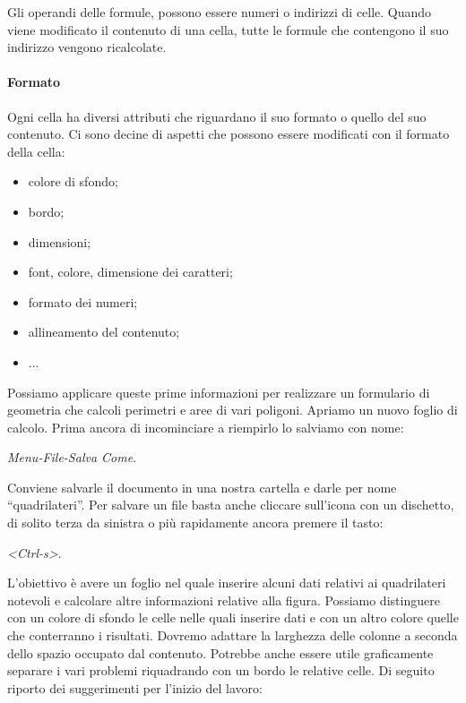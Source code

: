 Gli operandi delle formule, possono essere numeri o indirizzi di celle.
Quando viene modificato il contenuto di una cella, tutte
le formule che contengono il suo indirizzo vengono ricalcolate.

\paragraph{Formato}

Ogni cella ha diversi attributi che riguardano il suo formato o quello del
suo contenuto.
Ci sono decine di aspetti che possono essere modificati con
il formato della cella:

\begin{itemize} [noitemsep]
\item colore di sfondo;
\item bordo;
\item dimensioni;
\item font, colore, dimensione dei caratteri;
\item formato dei numeri;
\item allineamento del contenuto;
\item ...
\end{itemize}

Possiamo applicare queste prime informazioni per realizzare un formulario di
geometria che calcoli perimetri e aree di vari poligoni.
Apriamo un nuovo foglio di calcolo. Prima ancora di incominciare a riempirlo
lo salviamo con nome:

\emph{Menu-File-Salva Come}.

Conviene salvarle il documento
in una nostra cartella e darle per nome ``quadrilateri''.
Per salvare un file basta anche cliccare sull'icona con un dischetto,
di solito terza da sinistra o più rapidamente ancora premere il tasto:

\emph{\textless{}Ctrl-s\textgreater{}}.

L'obiettivo è avere un foglio nel quale inserire alcuni dati relativi ai
quadrilateri notevoli e calcolare altre informazioni relative alla figura.
Possiamo distinguere con un colore di sfondo le celle nelle quali inserire
dati e con un altro colore quelle che conterranno i risultati.
Dovremo adattare la larghezza delle colonne a seconda dello spazio occupato
dal contenuto.
Potrebbe anche essere utile graficamente separare i vari problemi
riquadrando con un bordo le relative celle.
Di seguito riporto dei suggerimenti per l'inizio del lavoro:

